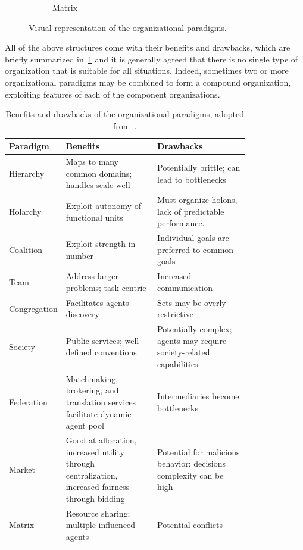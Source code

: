 \begin{figure}
\begin{subfigure}[h]{0.3\linewidth}
        \caption{Matrix}
        \label{fig:matrix}
    \end{subfigure}
    \caption{Visual representation of the organizational paradigms.}
    \label{fig:organizational-paradigms}
\end{figure}

All of the above structures come with their benefits and drawbacks, which are briefly summarized in~\cref{table:orgs-advantages-disadvantages} and it is generally agreed that there is no single type of organization that is suitable for all situations.
Indeed, sometimes two or more organizational paradigms may be combined to form a compound organization, exploiting features of each of the component organizations.


\begin{table}[h]
    \centering
    \begin{tabular}{ | l p{0.4\linewidth} p{0.4\linewidth} | }
        \hline
        \textbf{Paradigm} & \textbf{Benefits} & \textbf{Drawbacks} \\\hline\hline
        Hierarchy & Maps to many common domains; handles scale well & Potentially brittle; can lead to bottlenecks \\\hline
        Holarchy & Exploit autonomy of functional units & Must organize holons, lack of predictable performance. \\\hline
        Coalition & Exploit strength in number & Individual goals are preferred to common goals \\\hline
        Team & Address larger problems; task-centric & Increased communication \\\hline
        Congregation & Facilitates agents discovery & Sets may be overly restrictive \\\hline
        Society & Public services; well-defined conventions & Potentially complex; agents may require society-related capabilities \\\hline
        Federation & Matchmaking, brokering, and translation services facilitate dynamic agent pool & Intermediaries become bottlenecks \\\hline
        Market & Good at allocation, increased utility through centralization, increased fairness through bidding & Potential for malicious behavior; decisions complexity can be high \\\hline
        Matrix & Resource sharing; multiple influenced agents & Potential conflicts \\\hline
    \end{tabular}
\caption{Benefits and drawbacks of the organizational paradigms, adopted from~\cite{Ahmed_Abbas_2015}.}
\label{table:orgs-advantages-disadvantages}
\end{table}

